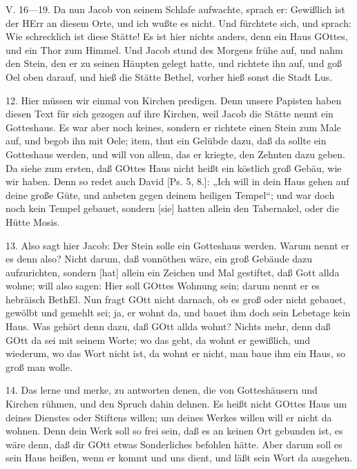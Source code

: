 \begin{schriftzitat}
V. 16—19. Da nun Jacob von seinem Schlafe aufwachte, sprach er: Gewißlich ist der HErr an diesem Orte, und ich wußte es nicht. Und fürchtete sich, und sprach: Wie schrecklich ist diese Stätte! Es ist hier nichts anders, denn ein Haus GOttes, und ein Thor zum Himmel. Und Jacob stund des Morgens frühe auf, und nahm den Stein, den er zu seinen Häupten gelegt hatte, und richtete ihn auf, und goß Oel oben darauf, und hieß die Stätte Bethel, vorher hieß sonst die Stadt Lus.
\end{schriftzitat}

12. Hier müssen wir einmal von Kirchen predigen. Denn unsere Papisten haben diesen Text für sich gezogen auf ihre Kirchen, weil Jacob die Stätte nennt ein Gotteshaus. Es war aber noch keines, sondern er richtete einen Stein zum Male auf, und begob ihn mit Oele; item, thut ein Gelübde dazu, daß da sollte ein Gotteshaus werden, und will von allem, das er kriegte, den Zehnten dazu geben. Da siehe zum ersten, daß GOttes Haus nicht heißt ein köstlich groß Gebäu, wie wir haben. Denn so redet auch David [Ps. 5, 8.]: „Ich will in dein Haus gehen auf deine große Güte, und anbeten gegen deinem heiligen Tempel“; und war doch noch kein Tempel gebauet, sondern [sie] hatten allein den Tabernakel, oder die Hütte Mosis.

13. Also sagt hier Jacob: Der Stein solle ein Gotteshaus werden. Warum nennt er es denn also? Nicht darum, daß vonnöthen wäre, ein groß Gebäude dazu aufzurichten, sondern [hat] allein ein Zeichen und Mal gestiftet, daß Gott allda wohne; will also sagen: Hier soll GOttes Wohnung sein; darum nennt er es hebräisch BethEl. Nun fragt GOtt nicht darnach, ob es groß oder nicht gebauet, gewölbt und gemehlt sei; ja, er wohnt da, und bauet ihm doch sein Lebetage kein Haus. Was gehört denn dazu, daß GOtt allda wohnt? Nichts mehr, denn daß GOtt da sei mit seinem Worte; wo das geht, da wohnt er gewißlich, und wiederum, wo das Wort nicht ist, da wohnt er nicht, man baue ihm ein Haus, so groß man wolle.

14. Das lerne und merke, zu antworten denen, die von Gotteshäusern und Kirchen rühmen, und den Spruch dahin dehnen. Es heißt nicht GOttes Haus um deines Dienstes oder Stiftens willen; um deines Werkes willen will er nicht da wohnen. Denn dein Werk soll so frei sein, daß es an keinen Ort gebunden ist, es wäre denn, daß dir GOtt etwas Sonderliches befohlen hätte. Aber darum soll es sein Haus heißen, wenn er kommt und uns dient, und läßt sein Wort da ausgehen.

